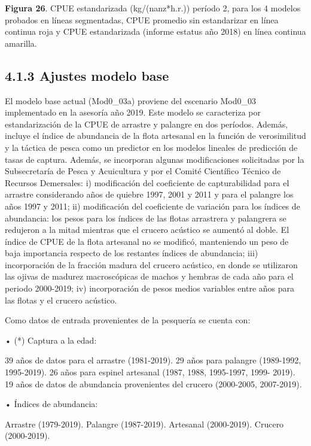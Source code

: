 \documentclass[
  spanish,
]{article}
\begin{document}
\small \textbf{Figura 26}. CPUE estandarizada (kg/(nanz*h.r.)) período
2, para los 4 modelos probados en líneas segmentadas, CPUE promedio sin
estandarizar en línea continua roja y CPUE estandarizada (informe
estatus año 2018) en línea continua amarilla. \vspace{0.5cm} \normalsize

\hypertarget{ajustes-modelo-base}{%
\subsection{4.1.3 Ajustes modelo base}\label{ajustes-modelo-base}}

El modelo base actual (Mod0\_03a) proviene del escenario Mod0\_03
implementado en la asesoría año 2019. Este modelo se caracteriza por
estandarización de la CPUE de arrastre y palangre en dos períodos.
Además, incluye el índice de abundancia de la flota artesanal en la
función de verosimilitud y la táctica de pesca como un predictor en los
modelos lineales de predicción de tasas de captura. Además, se
incorporan algunas modificaciones solicitadas por la Subsecretaría de
Pesca y Acuicultura y por el Comité Científico Técnico de Recursos
Demersales: i) modificación del coeficiente de capturabilidad para el
arrastre considerando años de quiebre 1997, 2001 y 2011 y para el
palangre los años 1997 y 2011; ii) modificación del coeficiente de
variación para los índices de abundancia: los pesos para los índices de
las flotas arrastrera y palangrera se redujeron a la mitad mientras que
el crucero acústico se aumentó al doble. El índice de CPUE de la flota
artesanal no se modificó, manteniendo un peso de baja importancia
respecto de los restantes índices de abundancia; iii) incorporación de
la fracción madura del crucero acústico, en donde se utilizaron las
ojivas de madurez macroscópicas de machos y hembras de cada año para el
periodo 2000-2019; iv) incorporación de pesos medios variables entre
años para las flotas y el crucero acústico.

Como datos de entrada provenientes de la pesquería se cuenta con:

• (*) Captura a la edad:

39 años de datos para el arrastre (1981-2019). 29 años para palangre
(1989-1992, 1995-2019). 26 años para espinel artesanal (1987, 1988,
1995-1997, 1999- 2019). 19 años de datos de abundancia provenientes del
crucero (2000-2005, 2007-2019).

• Índices de abundancia:

Arrastre (1979-2019). Palangre (1987-2019). Artesanal (2000-2019).
Crucero (2000-2019).
\end{document}
